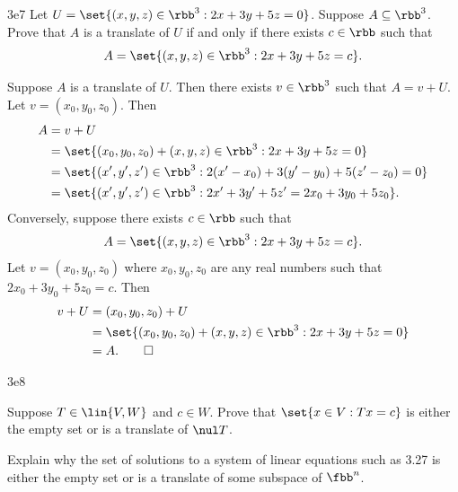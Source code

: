 \begin{exercise}{3e7}
    Let $U = \set{(x, y, z) \in \rbb^3 : 2x + 3y + 5z = 0}$.
	Suppose $A \subseteq \rbb^3$.
	Prove that $A$ is a translate of $U$ if and only if there exists $c \in \rbb$ such that
    \[
    	A = \set{(x, y, z) \in \rbb^3 : 2x + 3y + 5z = c}.
    \]
\end{exercise}

\begin{sol}
    Suppose $A$ is a translate of $U$.
	Then there exists $v \in \rbb^3$ such that $A = v + U$.
	Let $v = (x_0, y_0, z_0)$.
	Then
    \begin{align*}
        A & = v + U \\
        & = \set{(x_0, y_0, z_0) + (x, y, z) \in \rbb^3 : 2x + 3y + 5z = 0} \\
        & = \set{(x', y', z') \in \rbb^3 : 2(x' - x_0) + 3(y' - y_0) + 5(z' - z_0) = 0} \\
        & = \set{(x', y', z') \in \rbb^3 : 2x' + 3y' + 5z' = 2x_0 + 3y_0 + 5z_0}.
    \end{align*}
    Conversely, suppose there exists $c \in \rbb$ such that
    \[
    	A = \set{(x, y, z) \in \rbb^3 : 2x + 3y + 5z = c}.
    \]
    Let $v = (x_0, y_0, z_0)$ where $x_0, y_0, z_0$ are any real numbers such that $2x_0 + 3y_0 + 5z_0 = c$.
	Then
    \begin{align*}
        v + U & = (x_0, y_0, z_0) + U \\
        & = \set{(x_0, y_0, z_0) + (x, y, z) \in \rbb^3 : 2x + 3y + 5z = 0} \\
        & = A. \qedhere
    \end{align*}
\end{sol}

\begin{exercise}{3e8}
    \begin{subexercises}
        \item Suppose $T \in \lin{V, W}$ and $c \in W$.
	Prove that $\set{x \in V : Tx = c}$ is either the empty set or is a translate of $\nul T$.
        \item Explain why the set of solutions to a system of linear equations such as 3.27 is either the empty set or is a translate of some subspace of $\fbb^n$.
    \end{subexercises}
\end{exercise}

